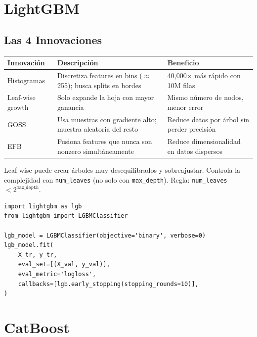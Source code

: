\documentclass[11pt, a4paper]{book}
\begin{document}
\section{LightGBM}

\subsection{Las 4 Innovaciones}

\begin{resumen}
  \begin{tabular}{lp{5.5cm}p{4.5cm}}
    \toprule
    \textbf{Innovación} & \textbf{Descripción} & \textbf{Beneficio}\\
    \midrule
    Histogramas & Discretiza features en bins ($\approx$255); busca splits en bordes &
      40,000$\times$ más rápido con 10M filas\\
    Leaf-wise growth & Solo expande la hoja con mayor ganancia & Mismo número de nodos,
      menor error\\
    GOSS & Usa muestras con gradiente alto; muestra aleatoria del resto &
      Reduce datos por árbol sin perder precisión\\
    EFB & Fusiona features que nunca son nonzero simultáneamente &
      Reduce dimensionalidad en datos dispersos\\
    \bottomrule
  \end{tabular}
\end{resumen}

\begin{alerta}
  Leaf-wise puede crear árboles muy desequilibrados y sobreajustar.
  Controla la complejidad con \texttt{num\_leaves} (no solo con \texttt{max\_depth}).
  Regla: \texttt{num\_leaves} $< 2^{\texttt{max\_depth}}$.
\end{alerta}

\begin{lstlisting}[caption={LightGBM con early stopping}]
import lightgbm as lgb
from lightgbm import LGBMClassifier

lgb_model = LGBMClassifier(objective='binary', verbose=0)
lgb_model.fit(
    X_tr, y_tr,
    eval_set=[(X_val, y_val)],
    eval_metric='logloss',
    callbacks=[lgb.early_stopping(stopping_rounds=10)],
)
\end{lstlisting}

\section{CatBoost}
\end{document}
